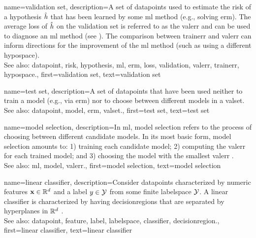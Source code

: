 {name={validation set},
 	description={A set of \glspl{datapoint} used to estimate 
  		the \gls{risk} of a \gls{hypothesis} $\hat{h}$ that has been learned by some 
  		\gls{ml} method (e.g., solving \gls{erm}). The average \gls{loss} of $\hat{h}$ 
  		on the \gls{validation} set is referred to as the \gls{valerr} and can be used to diagnose an 
  		\gls{ml} method (see \cite[Sec. 6.6]{MLBasics}). The comparison between \gls{trainerr} 
  		and \gls{valerr} can inform directions for the improvement of the \gls{ml} method (such as 
  		using a different \gls{hypospace}).
			\\
		See also: \gls{datapoint}, \gls{risk}, \gls{hypothesis}, \gls{ml}, \gls{erm}, \gls{loss}, \gls{validation}, \gls{valerr}, \gls{trainerr}, \gls{hypospace}.},
	first={validation set},
	text={validation set}  
}

{name={test set},
	description={A set of \glspl{datapoint} that have  
		been used neither to train a \gls{model} (e.g., via \gls{erm}) nor 
		to choose between different \glspl{model} in a \gls{valset}.
				\\
		See also: \gls{datapoint}, \gls{model}, \gls{erm}, \gls{valset}.},
	first={test set},
	text={test set}  
}


{name={model selection},
	description={In \gls{ml}, \gls{model} selection refers to the 
		process of choosing between different candidate \glspl{model}. In its most 
		basic form, \gls{model} selection amounts to: 1) training each candidate \gls{model}; 
		2) computing the \gls{valerr} for each trained \gls{model}; and 3) choosing the \gls{model} 
		with the smallest \gls{valerr} \cite[Ch. 6]{MLBasics}. 
				\\
		See also: \gls{ml}, \gls{model}, \gls{valerr}.},
	first={model selection},
	text={model selection}  
}


{name={linear classifier}, 
	description={Consider \glspl{datapoint} characterized by numeric \glspl{feature} ${\bf x} \in \mathbb{R}^{d}$ 
	    	and a \gls{label} $y \in \mathcal{Y}$ from some finite \gls{labelspace} $\mathcal{Y}$. 
		A linear \gls{classifier} is characterized by having \glspl{decisionregion} that are 
		separated by hyperplanes in $\mathbb{R}^{d}$ \cite[Ch. 2]{MLBasics}.
				\\
		See also: \gls{datapoint}, \gls{feature}, \gls{label}, \gls{labelspace}, \gls{classifier}, \gls{decisionregion}.},
	first={linear classifier},
	text={linear classifier} 
}


